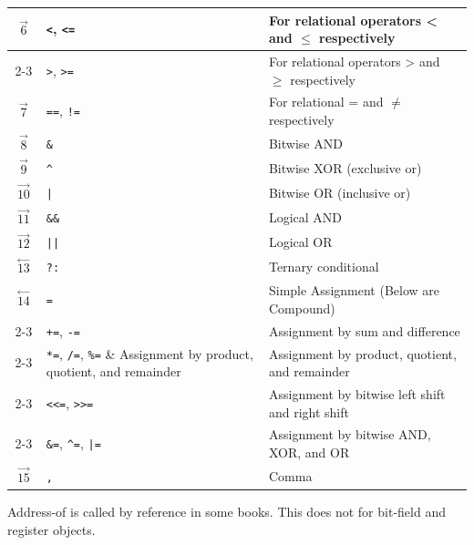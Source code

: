 \begin{center}
\begin{longtable}{|c|l|l|}
\hline
$\mathop{6}\limits ^{\rightarrow}$ & \verb|<|, \verb|<=| & For relational operators \textless{} and $\le$ respectively \\
\cline{2-3}
 & \verb|>|, \verb|>=| & For relational operators \textgreater{} and $\ge$ respectively \\
\hline
$\mathop{7}\limits ^{\rightarrow}$ & \verb|==|, \verb|!=| & For relational = and $\neq$ respectively \\
\hline
$\mathop{8}\limits ^{\rightarrow}$ & \verb|&| & Bitwise AND \\
\hline
$\mathop{9}\limits ^{\rightarrow}$ & \verb|^| & Bitwise XOR (exclusive or) \\
\hline
$\mathop{10}\limits ^{\rightarrow}$ & \verb!|! & Bitwise OR (inclusive or) \\
\hline
$\mathop{11}\limits ^{\rightarrow}$ & \verb|&&| & Logical AND \\
\hline
$\mathop{12}\limits ^{\rightarrow}$ & \verb!||! & Logical OR \\
\hline
$\mathop{13}\limits ^{\leftarrow}$ & \verb|?:| & Ternary conditional \\
\hline
$\mathop{14}\limits ^{\leftarrow}$ & \verb|=| & Simple Assignment (Below are Compound) \\
\cline{2-3}
 & \verb|+=|, \verb|-=| & Assignment by sum and difference \\
\cline{2-3}
 & \verb|*=|, \verb|/=|, \verb|%=| & Assignment by product, quotient, and remainder \\
\cline{2-3}
 & \verb|<<=|, \verb|>>=| & Assignment by bitwise left shift and right shift \\
\cline{2-3}
 & \verb|&=|, \verb|^|\verb|=|, \verb!|=! & Assignment by bitwise AND, XOR, and OR \\
\hline
$\mathop{15}\limits ^{\rightarrow}$ & \verb|,| & Comma \\
\hline

\end{longtable}

\end{center}
Address-of is called by reference in some books. This does not for bit-field and register objects.

